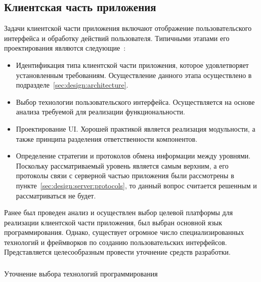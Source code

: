 \subsection{Клиентская часть приложения}
\label{sec:design:client}

Задачи клиентской части приложения включают отображение пользовательского интерфейса и обработку действий пользователя. Типичными этапами его проектирования являются следующие~\cite[с.~78]{applicationArchitectureGuide}:

\begin{itemize}
	\item Идентификация типа клиентской части приложения, которое удовлетворяет установленным требованиям. Осуществление данного этапа осуществлено в подразделе~\ref{sec:design:architecture}.
	\item Выбор технологии пользовательского интерфейса. Осуществляется на основе анализа требуемой для реализации функциональности.
	\item Проектирование UI. Хорошей практикой является реализация модульности, а также принципа разделения ответственности компонентов.
	\item Определение стратегии и протоколов обмена информации между уровнями. Поскольку рассматриваемый уровень является самым верхним, а его протоколы связи с серверной частью приложения были рассмотрены в пункте~\ref{sec:design:server:protocols}, то данный вопрос считается решенным и рассматриваться не будет.
\end{itemize}

Ранее был проведен анализ и осуществлен выбор целевой платформы для реализации клиентской части приложения, был выбран основной язык программирования. Однако, существует огромное число специализированных технологий и фреймворков по созданию пользовательских интерфейсов. Представляется целесообразным провести уточнение средств разработки.

\subsubsection{} Уточнение выбора технологий программирования
\label{sec:design:client:technologies}

